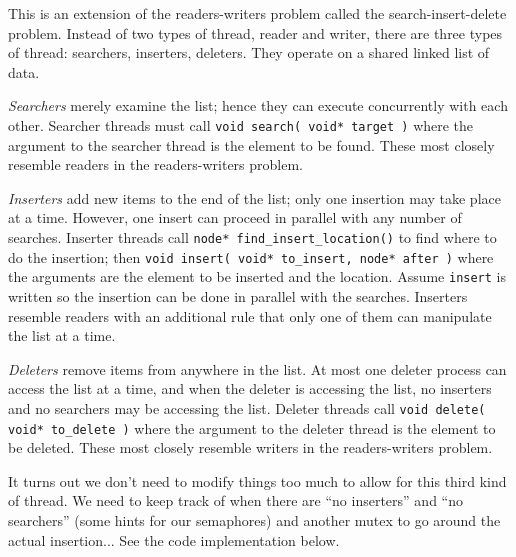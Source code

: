 This is an extension of the readers-writers problem called the search-insert-delete problem. Instead of two types of thread, reader and writer, there are three types of thread: searchers, inserters, deleters. They operate on a shared linked list of data.

\textit{Searchers} merely examine the list; hence they can execute concurrently with each other. Searcher threads must call \texttt{void search( void* target )} where the argument to the searcher thread is the element to be found. These most closely resemble readers in the readers-writers problem.

\textit{Inserters} add new items to the end of the list; only one insertion may take place at a time. However, one insert can proceed in parallel with any number of searches. Inserter threads call \texttt{node* find\_insert\_location()} to find where to do the insertion; then \texttt{void insert( void* to\_insert, node* after )} where the arguments are the element to be inserted and the location. Assume \texttt{insert} is written so the insertion can be done in parallel with the searches. Inserters resemble readers with an additional rule that only one of them can manipulate the list at a time.

\textit{Deleters} remove items from anywhere in the list. At most one deleter process can access the list at a time, and when the deleter is accessing the list, no inserters and no searchers may be accessing the list. Deleter threads call \texttt{void delete( void* to\_delete )} where the argument to the deleter thread is the element to be deleted. These most closely resemble writers in the readers-writers problem.

It turns out we don't need to modify things too much to allow for this third kind of thread. We need to keep track of when there are ``no inserters'' and ``no searchers'' (some hints for our semaphores) and another mutex to go around the actual insertion... See the code implementation below.

